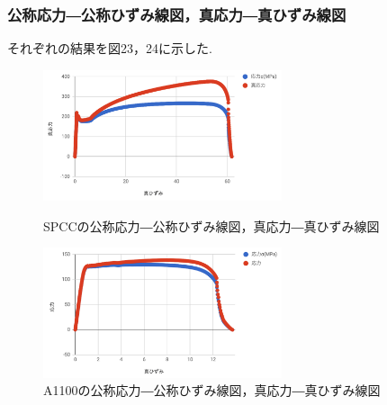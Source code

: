 \documentclass[10pt，a4j]{jsarticle}
\begin{document}
  \subsubsection{公称応力―公称ひずみ線図，真応力―真ひずみ線図}
    それぞれの結果を図23，24に示した.
    \begin{figure}[htbp]
      \begin{minipage}{0.5\hsize}
        \begin{center}
          \includegraphics[width=7cm]{../img/spcc_.png}
          \caption{SPCCの公称応力―公称ひずみ線図，真応力―真ひずみ線図}
        \end{center}
      \end{minipage}
      \begin{minipage}{0.5\hsize}
        \begin{center}
          \includegraphics[width=7cm]{../img/a1100_.png}
          \caption{A1100の公称応力―公称ひずみ線図，真応力―真ひずみ線図}
        \end{center}
      \end{minipage}
    \end{figure}
\end{document}
